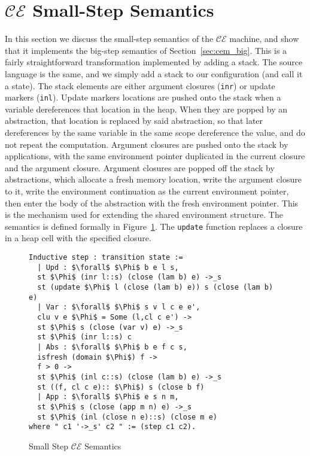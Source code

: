 \section{$\mathcal{CE}$ Small-Step Semantics} \label{sec:cem_small}

In this section we discuss the small-step semantics of the $\mathcal{CE}$
machine, and show that it implements the big-step semantics of
Section~\ref{sec:cem_big}. This is a fairly straightforward transformation implemented
by adding a stack. The source language is the same, and we simply add a stack to
our configuration (and call it a state). The stack elements are either argument
closures (\texttt{inr}) or update markers (\texttt{inl}). Update markers
locations are pushed onto the stack when a variable dereferences that location
in the heap. When they are popped by an abstraction, that location is replaced
by said abstraction, so that later dereferences by the same variable in
the same scope dereference the value, and do not repeat the computation. Argument
closures are pushed onto the stack by applications, with the same environment
pointer duplicated in the current closure and the argument closure. Argument
closures are popped off the stack by abstractions, which allocate a fresh memory
location, write the argument closure to it, write the environment continuation
as the current environment pointer, then enter the body of the abstraction with
the fresh environment pointer. This is the mechanism used for extending the
shared environment structure. The semantics is defined formally in
Figure~\ref{fig:cesm}. The \texttt{update} function replaces a closure in a heap
cell with the specified closure.  

\begin{figure}
\begin{lstlisting}
Inductive step : transition state :=
  | Upd : $\forall$ $\Phi$ b e l s, 
  st $\Phi$ (inr l::s) (close (lam b) e) ->_s 
  st (update $\Phi$ l (close (lam b) e)) s (close (lam b) e)
  | Var : $\forall$ $\Phi$ s v l c e e', 
  clu v e $\Phi$ = Some (l,cl c e') -> 
  st $\Phi$ s (close (var v) e) ->_s 
  st $\Phi$ (inr l::s) c
  | Abs : $\forall$ $\Phi$ b e f c s, 
  isfresh (domain $\Phi$) f -> 
  f > 0 -> 
  st $\Phi$ (inl c::s) (close (lam b) e) ->_s 
  st ((f, cl c e):: $\Phi$) s (close b f)
  | App : $\forall$ $\Phi$ e s n m, 
  st $\Phi$ s (close (app m n) e) ->_s 
  st $\Phi$ (inl (close n e)::s) (close m e)
where " c1 '->_s' c2 " := (step c1 c2).
\end{lstlisting}
\caption{Small Step $\mathcal{CE}$ Semantics}
\label{fig:cesm}
\end{figure}


